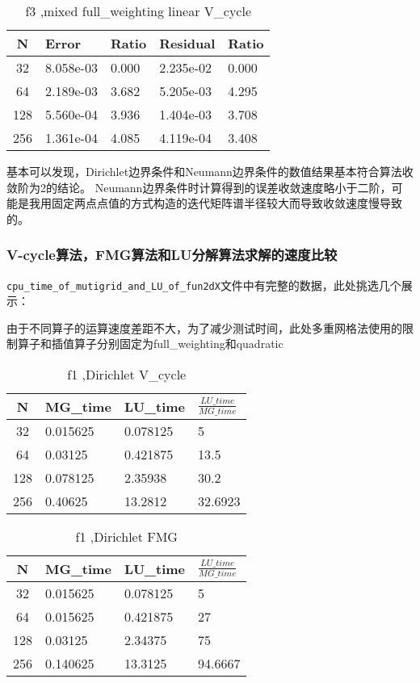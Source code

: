 \documentclass[12]{article}%
\begin{document}
\begin{table}[H]
    \centering
    \caption{f3 ,mixed full\_weighting linear V\_cycle}
    \begin{tabular}{|c|l|l|l|l|}
    \hline
    N & Error       & Ratio     & Residual    & Ratio     \\ \hline 
     32 & 8.058e-03 & 0.000 & 2.235e-02 & 0.000\\ \hline 
     64 & 2.189e-03 & 3.682 & 5.205e-03 & 4.295\\ \hline 
     128 & 5.560e-04 & 3.936 & 1.404e-03 & 3.708\\ \hline 
     256 & 1.361e-04 & 4.085 & 4.119e-04 & 3.408\\ \hline 
 \end{tabular}
    \end{table}
基本可以发现，Dirichlet边界条件和Neumann边界条件的数值结果基本符合算法收敛阶为2的结论。
Neumann边界条件时计算得到的误差收敛速度略小于二阶，可能是我用固定两点点值的方式构造的迭代矩阵谱半径较大而导致收敛速度慢导致的。

\subsubsection{{V-cycle算法，FMG算法和LU分解算法求解的速度比较}}

\verb|cpu_time_of_mutigrid_and_LU_of_fun2dX|文件中有完整的数据，此处挑选几个展示：

由于不同算子的运算速度差距不大，为了减少测试时间，此处多重网格法使用的限制算子和插值算子分别固定为full\_weighting和quadratic
\begin{table}[H]
    \centering
    \caption{f1 ,Dirichlet V\_cycle}
    \begin{tabular}{|c|l|l|l|}
    \hline
    N & MG\_time       & LU\_time     & $\frac{LU\_time}{MG\_time}$    \\ \hline 
    32 & 0.015625 & 0.078125 & 5\\ \hline 
    64 & 0.03125 & 0.421875 & 13.5\\ \hline 
    128 & 0.078125 & 2.35938 & 30.2\\ \hline 
    256 & 0.40625 & 13.2812 & 32.6923\\ \hline 
\end{tabular}
\end{table}

\begin{table}[H]
    \centering
    \caption{f1 ,Dirichlet FMG}
    \begin{tabular}{|c|l|l|l|}
    \hline
    N & MG\_time       & LU\_time     & $\frac{LU\_time}{MG\_time}$    \\ \hline 
    32 & 0.015625 & 0.078125 & 5\\ \hline 
    64 & 0.015625 & 0.421875 & 27\\ \hline 
    128 & 0.03125 & 2.34375 & 75\\ \hline 
    256 & 0.140625 & 13.3125 & 94.6667\\ \hline 
\end{tabular}
\end{table}
\end{document}
